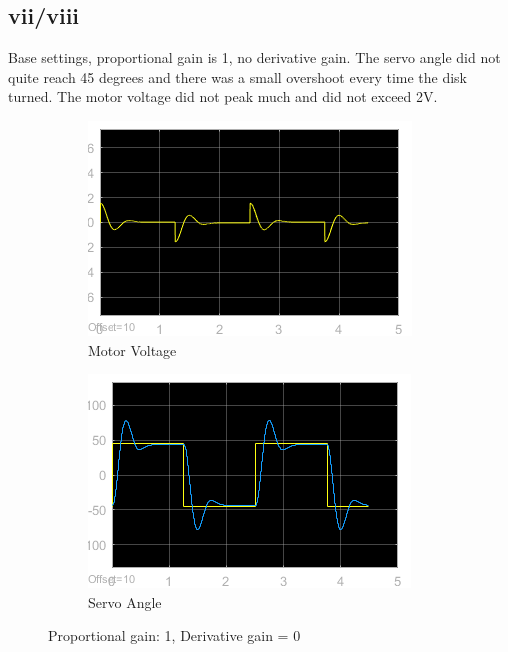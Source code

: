 \documentclass[12pt]{article}
\begin{document}
\subsection*{vii/viii} %
Base settings, proportional gain is 1, no derivative gain. The servo angle did not quite reach 45 degrees and there was a small overshoot every time the disk turned. The motor voltage did not peak much and did not exceed 2V.
\begin{figure}[h!]
    \centering
    \begin{subfigure}[b]{0.49\textwidth}
        \includegraphics[width=\textwidth]{vii_voltage}    
        \caption{Motor Voltage}    
    \end{subfigure}
    \begin{subfigure}[b]{0.49\textwidth}
        \includegraphics[width=\textwidth]{vii_angle}
        \caption{Servo Angle}
    \end{subfigure}
    \caption{\label{fig:vii} Proportional gain: 1, Derivative gain = 0}
\end{figure}
\end{document}
